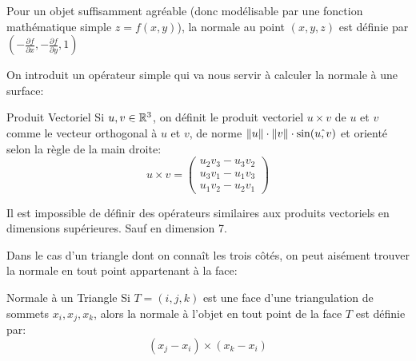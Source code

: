 \documentclass{classe}
\begin{document}
\begin{remarque}{}{}
	Pour un objet suffisamment agréable (donc modélisable par une fonction mathématique simple $z = f(x, y)$), la normale au point $(x, y, z)$ est définie par $(-\frac{\partial{f}}{\partial{x}}, -\frac{\partial{f}}{\partial{y}}, 1)$
\end{remarque}

On introduit un opérateur simple qui va nous servir à calculer la normale à une surface:
\begin{définition}{Produit Vectoriel}{}
	Si $u, v \in \mathbb{R}^{3}$, on définit le produit vectoriel $u \times v$ de $u$ et $v$ comme le vecteur orthogonal à $u$ et $v$, de norme $\left\lVert u \right\rVert\cdot\left\lVert v \right\rVert\cdot\sin(\hat{u, v})$ et orienté selon la règle de la main droite:
	\begin{equation*}
		u \times v = \begin{pmatrix}
			u_{2}v_{3} - u_{3}v_{2}\\
			u_{3}v_{1} - u_{1}v_{3}\\
			u_{1}v_{2} - u_{2}v_{1}
		\end{pmatrix}
	\end{equation*}
\end{définition}

\begin{remarque}{}{}
	Il est impossible de définir des opérateurs similaires aux produits vectoriels en dimensions supérieures. Sauf en dimension 7.
\end{remarque}

Dans le cas d'un triangle dont on connaît les trois côtés, on peut aisément trouver la normale en tout point appartenant à la face:
\begin{propositionfr}{Normale à un Triangle}{}
	Si $T = (i, j, k)$ est une face d'une triangulation de sommets $x_{i}, x_{j}, x_{k}$, alors la normale à l'objet en tout point de la face $T$ est définie par:
	\begin{equation*}
		(x_{j} - x_{i}) \times (x_{k} - x_{i})
	\end{equation*}
\end{propositionfr}
\end{document}
